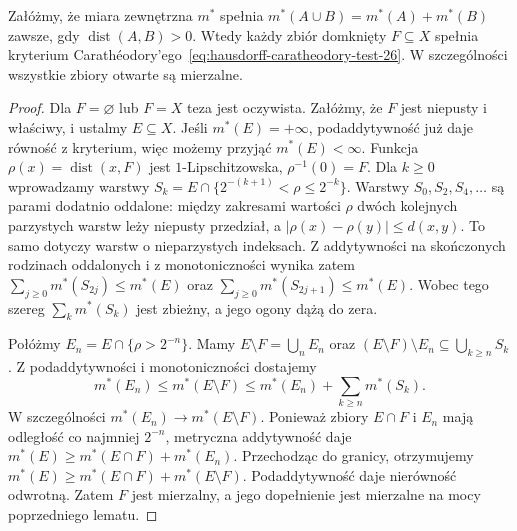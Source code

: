 \begin{lemat}
\label{lem:hausdorff-metric-open-26}
Załóżmy, że miara zewnętrzna $m^*$ spełnia
$m^*(A\cup B)=m^*(A)+m^*(B)$ zawsze, gdy
$\operatorname{dist}(A,B)>0$. Wtedy każdy zbiór
domknięty $F\subseteq X$ spełnia kryterium
Carathéodory'ego~\eqref{eq:hausdorff-caratheodory-test-26}.
W szczególności wszystkie zbiory otwarte są mierzalne.
\end{lemat}
\begin{proof}
Dla $F=\varnothing$ lub $F=X$ teza jest oczywista.
Załóżmy, że $F$ jest niepusty i właściwy, i ustalmy
$E\subseteq X$. Jeśli $m^*(E)=+\infty$,
podaddytywność już daje równość z kryterium,
więc możemy przyjąć $m^*(E)<\infty$.
Funkcja $\rho(x)=\operatorname{dist}(x,F)$
jest $1$-Lipschitzowska, $\rho^{-1}(0)=F$.
Dla $k\ge0$ wprowadzamy warstwy
$S_k=E\cap\{2^{-(k+1)}<\rho\leq2^{-k}\}$.
Warstwy $S_0,S_2,S_4,\ldots$ są parami dodatnio
oddalone: między zakresami wartości $\rho$ dwóch
kolejnych parzystych warstw leży niepusty przedział,
a $|\rho(x)-\rho(y)|\leq d(x,y)$.
To samo dotyczy warstw o nieparzystych indeksach.
Z addytywności na skończonych rodzinach oddalonych
i z monotoniczności wynika zatem
$\sum_{j\ge0}m^*(S_{2j})\leq m^*(E)$ oraz
$\sum_{j\ge0}m^*(S_{2j+1})\leq m^*(E)$.
Wobec tego szereg $\sum_km^*(S_k)$ jest zbieżny,
a jego ogony dążą do zera.

Połóżmy $E_n=E\cap\{\rho>2^{-n}\}$. Mamy
$E\setminus F=\bigcup_nE_n$ oraz
$(E\setminus F)\setminus E_n\subseteq\bigcup_{k\ge n}S_k$.
Z podaddytywności i monotoniczności dostajemy
\[
 m^*(E_n)\leq m^*(E\setminus F)
 \leq m^*(E_n)+\sum_{k\ge n}m^*(S_k).
\]
W szczególności $m^*(E_n)\to m^*(E\setminus F)$.
Ponieważ zbiory $E\cap F$ i $E_n$ mają odległość
co najmniej $2^{-n}$, metryczna addytywność daje
$m^*(E)\geq m^*(E\cap F)+m^*(E_n)$.
Przechodząc do granicy, otrzymujemy
$m^*(E)\geq m^*(E\cap F)+m^*(E\setminus F)$.
Podaddytywność daje nierówność odwrotną.
Zatem $F$ jest mierzalny, a jego dopełnienie
jest mierzalne na mocy poprzedniego lematu.
\end{proof}



